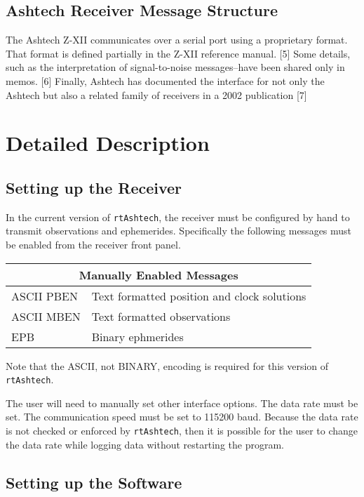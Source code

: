 \subsection{Ashtech Receiver Message Structure}

The Ashtech Z-XII communicates over a serial port using a proprietary
format. That format is defined partially in the Z-XII reference manual. [5]
Some details, such as the interpretation of signal-to-noise messages--have been
shared only in memos. [6] Finally, Ashtech has documented the interface
for not only the Ashtech but also a related family of receivers in a 2002
publication [7] 


\section{Detailed Description}

\subsection{Setting up the Receiver}

In the current version of \texttt{rtAshtech}, the receiver must be configured 
by hand to transmit observations and ephemerides. Specifically the following 
messages must be enabled from the receiver front panel.
 
\begin{center}
\begin{tabular}{|l|l|}
\hline
\multicolumn{2}{|c|}{Manually Enabled Messages} \\
\hline
ASCII PBEN   & Text formatted position and clock solutions \\
ASCII MBEN   & Text formatted observations \\
EPB          & Binary ephmerides \\
\hline
\end{tabular}
\end{center}

Note that the ASCII, not BINARY, encoding is required for this version of
\texttt{rtAshtech}. 

The user will need to manually set other interface options. The data rate 
must be set. The communication speed must be set to 115200 baud. Because
the data rate is not checked or enforced by \texttt{rtAshtech}, then
it is possible for the user to change the data rate while logging 
data without restarting the program.

\subsection{Setting up the Software}

